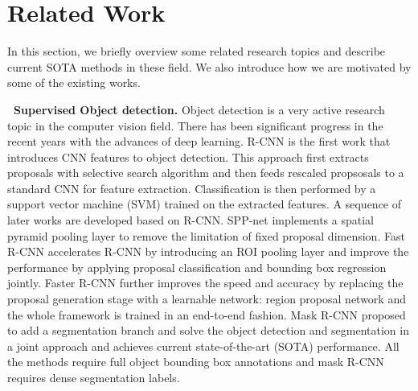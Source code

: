 
\vspace{-0.5\baselineskip}
\section{Related Work}
\vspace{-0.5\baselineskip}
\label{sec:related}
In this section, we briefly overview some related research topics and describe current SOTA methods in these field. We also introduce how we are motivated by some of the existing works.

\textbf{~Supervised Object detection.}
Object detection is a very active research topic in the computer vision field. There has been significant progress in the recent years with the advances of deep learning. R-CNN \cite{girshick14CVPR} is the first work that introduces CNN features to object detection. This approach first extracts proposals with selective search \cite{uijlings2013selective} algorithm and then feeds rescaled propsosals to a standard CNN for feature extraction. Classification is then performed by a support vector machine (SVM) \cite{hearst1998support} trained on the extracted features. A sequence of later works are developed based on R-CNN. SPP-net \cite{} implements a spatial pyramid pooling layer to remove the limitation of fixed proposal dimension. Fast R-CNN \cite{} accelerates R-CNN by introducing an ROI pooling layer and improve the performance by applying proposal classification and bounding box regression jointly. Faster R-CNN further improves the speed and accuracy by replacing the proposal generation stage with a learnable network: region proposal network and the whole framework is trained in an end-to-end fashion. Mask R-CNN \cite{} proposed to add a segmentation branch and solve the object detection and segmentation in a joint approach and achieves current state-of-the-art (SOTA) performance. All the methods require full object bounding box annotations and mask R-CNN requires dense segmentation labels.


